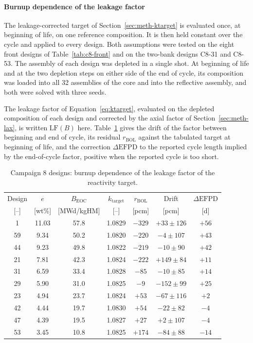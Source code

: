 \paragraph{Burnup dependence of the leakage factor}
\label{sec:res-kt-burnup}

The leakage-corrected target of Section~\ref{sec:meth-ktarget} is
evaluated once, at beginning of life, on one reference composition. It
is then held constant over the cycle and applied to every design. Both
assumptions were tested on the eight front designs of
Table~\ref{tab:c8-front} and on the two-bank designs C8-31 and C8-53. The
assembly of each design was depleted in a single shot. At beginning of
life and at the two depletion steps on either side of the end of cycle,
its composition was loaded into all 32 assemblies of the core and into
the reflective assembly, and both were solved with three seeds.

The leakage factor of Equation~\eqref{eq:ktarget}, evaluated on the
depleted composition of each design and corrected by the axial factor
of Section~\ref{sec:meth-lax}, is written $\mathrm{LF}(B)$ here.
Table~\ref{tab:kt-burnup} gives the drift of the factor between
beginning and end of cycle, its residual $r_\mathrm{BOL}$ against the
tabulated target at beginning of life, and the correction
$\Delta\mathrm{EFPD}$ to the reported cycle length implied by the
end-of-cycle factor, positive when the reported cycle is too short.

\begin{table}[htbp]
  \centering
  \small
  \caption{Campaign 8 designs: burnup dependence of the leakage factor of the reactivity target.}
  \label{tab:kt-burnup}
  \begin{tabular}{@{}ccccccc@{}}
    \toprule
    Design & $e$ & $B_\mathrm{EOC}$ & $k_\mathrm{target}$ &
      $r_\mathrm{BOL}$ & Drift & $\Delta\mathrm{EFPD}$ \\
    {[--]} & [wt\%] & [MWd/kgHM] & [--] & [pcm] & [pcm] & [d] \\
    \midrule
    1  & 11.03 & 57.8 & 1.0829 & $-329$ & $+33 \pm 126$  & $+56$ \\
    59 & 9.34  & 50.2 & 1.0820 & $-220$ & $-4 \pm 107$   & $+43$ \\
    44 & 9.23  & 49.8 & 1.0822 & $-219$ & $-10 \pm 90$   & $+42$ \\
    21 & 7.81  & 42.3 & 1.0824 & $-222$ & $+149 \pm 84$  & $+11$ \\
    31 & 6.59  & 33.4 & 1.0828 & $-85$  & $-10 \pm 85$   & $+14$ \\
    29 & 5.90  & 31.0 & 1.0825 & $-9$   & $-152 \pm 99$  & $+25$ \\
    23 & 4.94  & 23.7 & 1.0824 & $+53$  & $-67 \pm 116$  & $+2$ \\
    42 & 4.44  & 19.7 & 1.0830 & $+54$  & $-22 \pm 82$   & $-4$ \\
    47 & 4.39  & 19.5 & 1.0827 & $+27$  & $+2 \pm 107$   & $-4$ \\
    53 & 3.45  & 10.8 & 1.0825 & $+174$ & $-84 \pm 88$   & $-14$ \\
    \bottomrule
  \end{tabular}
\end{table}

